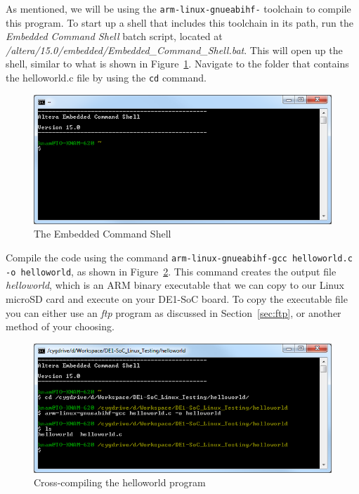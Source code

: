 \documentclass[11pt, twoside, pdftex]{article}
\begin{document}
As mentioned, we will be using the \texttt{arm-linux-gnueabihf-} toolchain to compile this 
program.  To start up a shell that includes this toolchain in its path, run the 
\textit{Embedded Command Shell} batch script, located at 
\textit{/altera\-/15.0/embed\-ded/Em\-bedded\_Comm\-and\_Sh\-ell.bat}. This will open up
the shell, similar to what is shown in Figure~\ref{fig:embedded_shell_1}. Navigate to the
folder that contains the helloworld.c file by using the \texttt{cd} command.

\begin{figure}[H]
   \begin{center}
       \includegraphics[scale=0.7]{figures/embedded_shell_1}
   \end{center}
	\vspace{-0.5cm}\caption{The Embedded Command Shell}
	\label{fig:embedded_shell_1}
\end{figure}

Compile the code using the command 
\texttt{arm-linux-gnueabihf-gcc helloworld.c -o helloworld}, as shown in 
Figure~\ref{fig:embedded_shell_2}. This command creates the output file \textit{helloworld}, which 
is an ARM binary executable that we can copy to our Linux microSD card and execute 
on your DE1-SoC board. To copy the executable file you can either use an {\it ftp} program as
discussed in Section~\ref{sec:ftp}, or another method of your choosing.

\begin{figure}[H]
   \begin{center}
       \includegraphics[scale=0.7]{figures/embedded_shell_2}
   \end{center}
   \caption{Cross-compiling the helloworld program}
	\label{fig:embedded_shell_2}
\end{figure}
\end{document}
